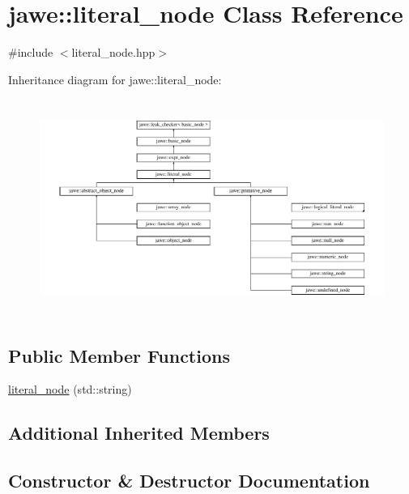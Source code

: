 \hypertarget{classjawe_1_1literal__node}{}\section{jawe\+:\+:literal\+\_\+node Class Reference}
\label{classjawe_1_1literal__node}


{\ttfamily \#include $<$literal\+\_\+node.\+hpp$>$}

Inheritance diagram for jawe\+:\+:literal\+\_\+node\+:\begin{figure}[H]
\begin{center}
\leavevmode
\includegraphics[height=7.096774cm]{classjawe_1_1literal__node}
\end{center}
\end{figure}
\subsection*{Public Member Functions}
\begin{DoxyCompactItemize}
\item 
\hyperlink{classjawe_1_1literal__node_a66d1f19b68f3a9759d5754ccfcd455c7}{literal\+\_\+node} (std\+::string)
\end{DoxyCompactItemize}
\subsection*{Additional Inherited Members}


\subsection{Constructor \& Destructor Documentation}
\mbox{\label{classjawe_1_1literal__node_a66d1f19b68f3a9759d5754ccfcd455c7}} 

